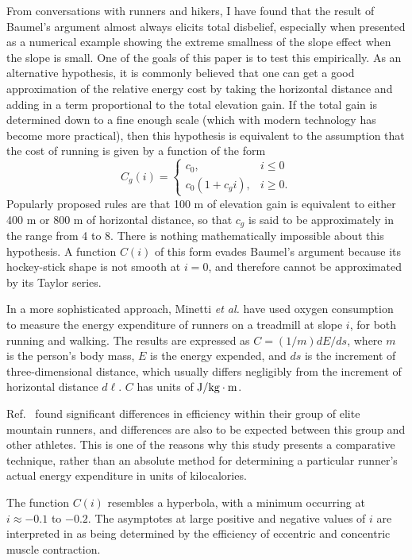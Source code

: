 \documentclass[10pt,letterpaper]{article}
\begin{document}
From conversations with runners and hikers, I have found that the result of Baumel's argument almost
always elicits total disbelief, especially when presented as a numerical example showing the extreme smallness
of the slope effect when the slope is small. One of the goals of this paper is to test this empirically.
As an alternative hypothesis, it is commonly believed that one can get a good approximation
of the relative energy cost by taking the horizontal distance and adding in a term proportional to the total elevation gain.
If the total gain is determined down to a fine enough scale (which with modern technology has become
more practical), then this hypothesis is equivalent to the assumption that the cost of running is
given by a function of the form
\begin{equation}\label{eq:gain-only}
   C_g(i) = 
  \begin{cases}
     c_0, & i\le0 \\
     c_0(1+c_g i), & i\ge 0.
  \end{cases}
\end{equation}
Popularly proposed rules are that 100 m of elevation gain is equivalent to either 400 m or 800 m of horizontal distance,
so that $c_g$ is said to be approximately in the range from 4 to 8. There is nothing mathematically impossible
about this hypothesis. A function $C(i)$ of this form evades Baumel's argument because its hockey-stick shape
is not smooth at $i=0$, and therefore cannot be approximated by its Taylor series.

In a more sophisticated approach, Minetti \emph{et al.}\cite{minetti} have used oxygen
consumption to measure the energy expenditure of runners on a treadmill at slope $i$, for both
running and walking.
The results are expressed as $C=(1/m)d E/d s$, where $m$ is the person's body mass,
$E$ is the energy expended, and $d s$ is the increment of three-dimensional distance, which
usually differs negligibly from the increment of horizontal distance $d \ell$.
$C$ has units of $\textup{J}/\textup{kg}\cdot\textup{m}$.

Ref.~\cite{minetti} found significant differences in efficiency within their group of elite mountain
runners, and differences are also to be expected between this group and other athletes. This is one
of the reasons why this study presents a comparative technique, rather than an absolute method for
determining a particular runner's actual energy expenditure in units of kilocalories.

The function $C(i)$ resembles a hyperbola, with a
minimum occurring at $i\approx -0.1$ to $-0.2$. 
The asymptotes
at large positive and negative values of $i$ are interpreted in \cite{minetti} as being determined by the
efficiency of eccentric and concentric muscle contraction. 
\end{document}
